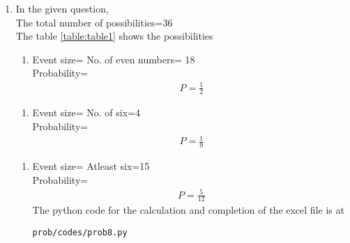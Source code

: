 \renewcommand{\theequation}{\theenumi}
\begin{enumerate}[label=\arabic*.,ref=\thesubsubsection.\theenumi]
\item In the given question,
\\
The total number of possibilities=36
\\
The table \ref{table:table1} shows the possibilities

%
\begin{enumerate}
\item Event size= No. of even numbers= 18
\\
Probability=
\begin{align}
P=\frac{1}{2}
\end{align}
\end{enumerate}
\begin{enumerate}
\item Event size= No. of six=4
\\
Probability=
\begin{align}
P=\frac{1}{9}
\end{align}
\end{enumerate}
\begin{enumerate}
\item Event size= Atleast six=15
\\
Probability=
\begin{align}
P=\frac{5}{12}
\end{align}
The python code for the calculation and completion of the excel file is at
\begin{lstlisting}
prob/codes/prob8.py
\end{lstlisting}

\end{enumerate}
\end{enumerate}